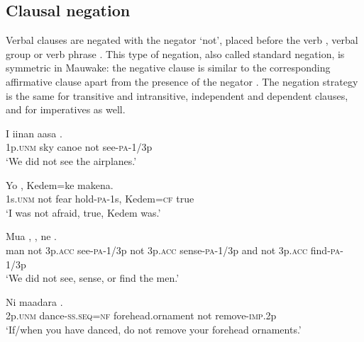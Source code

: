 \subsection{Clausal negation}
{}
Verbal clauses are negated with the negator  `not', placed before the verb , verbal group  or verb phrase . 
This type of negation, also called standard negation, is symmetric in Mauwake: the negative clause is similar to the corresponding affirmative clause apart from the presence of the negator \citep[61--67]{Miestamo2005}. The negation strategy is the same for transitive and intransitive, independent and dependent clauses, and for imperatives as well. 

\ea%
\label{ex:x1090}
\gll I  iinan  aasa    . \\
1p.\textsc{unm}  sky  canoe  not  see-\textsc{pa}-1/3p\\
\glt `We did not see the airplanes.'
\z

\ea%
\label{ex:x1091}
\gll Yo      ,  Kedem=ke  makena. \\
1s.\textsc{unm}  not  fear  hold-\textsc{pa}-1s,  Kedem=\textsc{cf}  true\\
\glt `I was not afraid, true, Kedem was.'
\z

\ea%
\label{ex:x1092}
\gll Mua      ,      , ne      .\\
man  not  3p.\textsc{acc}  see-\textsc{pa}-1/3p  not  3p.\textsc{acc}  sense-\textsc{pa}-1/3p and  not  3p.\textsc{acc}  find-\textsc{pa}-1/3p\\
\glt `We did not see, sense, or find the men.'
\z

\ea%
\label{ex:x1113}
\gll Ni   maadara    . \\
2p.\textsc{unm}  dance-\textsc{ss}.\textsc{seq}=\textsc{nf}  forehead.ornament  not  remove-\textsc{imp}.2p\\
\glt `If/when you have danced, do not remove your forehead ornaments.'
\z

